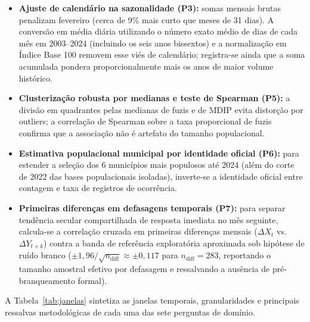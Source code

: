 \documentclass[11pt,a4paper]{article}
\begin{document}
\begin{itemize}
  \item \textbf{Ajuste de calendário na sazonalidade (P3):} somas mensais brutas penalizam fevereiro (cerca de 9\% mais curto que meses de 31 dias). A conversão em média diária utilizando o número exato médio de dias de cada mês em 2003--2024 (incluindo os seis anos bissextos) e a normalização em Índice Base 100 removem esse viés de calendário; registra-se ainda que a soma acumulada pondera proporcionalmente mais os anos de maior volume histórico.
  \item \textbf{Clusterização robusta por medianas e teste de Spearman (P5):} a divisão em quadrantes pelas medianas de fuzis e de MDIP evita distorção por outliers; a correlação de Spearman sobre a taxa proporcional de fuzis confirma que a associação não é artefato do tamanho populacional.
  \item \textbf{Estimativa populacional municipal por identidade oficial (P6):} para estender a seleção dos 6 municípios mais populosos até 2024 (além do corte de 2022 das bases populacionais isoladas), inverte-se a identidade oficial entre contagem e taxa de registros de ocorrência.
  \item \textbf{Primeiras diferenças em defasagens temporais (P7):} para separar tendência secular compartilhada de resposta imediata no mês seguinte, calcula-se a correlação cruzada em primeiras diferenças mensais ($\Delta X_t$ vs.\ $\Delta Y_{t+k}$) contra a banda de referência exploratória aproximada sob hipótese de ruído branco ($\pm 1{,}96 / \sqrt{n_{\text{diff}}} \approx \pm 0{,}117$ para $n_{\text{diff}} = 283$, reportando o tamanho amostral efetivo por defasagem e ressalvando a ausência de pré-branqueamento formal).
\end{itemize}

A Tabela~\ref{tab:janelas} sintetiza as janelas temporais, granularidades e principais ressalvas metodológicas de cada uma das sete perguntas de domínio.
\end{document}
